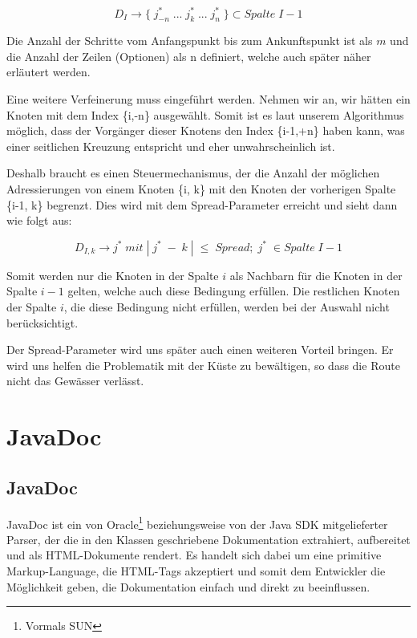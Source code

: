 \documentclass[a4paper,10pt]{article}
\begin{document}
\begin{equation}
\label{eq_dyn:6}
D_I \to \{\;j_{-n}^*\; ... \;j_{k}^* \;...\; j_{n}^*\;\} \subset Spalte\; I-1
\end{equation}

Die Anzahl der Schritte vom Anfangspunkt bis zum Ankunftspunkt ist als \(m\)
und die Anzahl der Zeilen (Optionen) als n definiert, welche auch später näher
erläutert werden.
 
Eine weitere Verfeinerung muss eingeführt werden. Nehmen wir an, wir hätten ein
Knoten mit dem Index \{i,-n\} ausgewählt. Somit ist es laut unserem Algorithmus
möglich, dass der Vorgänger dieser Knotens den Index \{i-1,+n\} haben kann, was
einer seitlichen Kreuzung entspricht und eher unwahrscheinlich ist.

Deshalb braucht es einen Steuermechanismus, der die Anzahl der möglichen
Adressierungen von einem Knoten \{i, k\} mit den Knoten der vorherigen Spalte
\{i-1, k\} begrenzt. Dies wird mit dem Spread-Parameter erreicht und sieht dann
wie folgt aus:

\begin{equation}
\label{eq_dyn:7}
D_{I,k} \to j^*\; mit\; |\;j^*\;-\;k\;| \;\le\; Spread;\; j^*\; \in Spalte\; I-1
\end{equation}
 
Somit werden nur die Knoten in der Spalte \(i\) als Nachbarn für die Knoten in
der Spalte \(i-1\) gelten, welche auch diese Bedingung erfüllen. Die
restlichen Knoten der Spalte \(i\), die diese Bedingung nicht erfüllen, werden
bei der Auswahl nicht berücksichtigt.

Der Spread-Parameter wird uns später auch einen weiteren Vorteil bringen. Er
wird uns helfen die Problematik mit der Küste zu bewältigen, so dass
die Route nicht das Gewässer verlässt.









\section{JavaDoc}

\subsection{JavaDoc}
JavaDoc ist ein von Oracle\footnote{Vormals SUN} beziehungsweise von der Java
SDK mitgelieferter Parser, der die in den Klassen geschriebene Dokumentation
extrahiert, aufbereitet und als HTML-Dokumente rendert. Es handelt sich dabei
um eine primitive Markup-Language, die HTML-Tags akzeptiert und somit dem
Entwickler die Möglichkeit geben, die Dokumentation einfach und direkt zu
beeinflussen.
\end{document}
